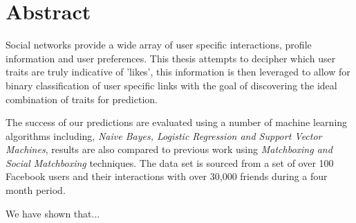 
\chapter*{Abstract}
\label{cha:abstract}

Social networks provide a wide array of user specific interactions, profile information and user preferences.
This thesis attempts to decipher which user traits are truly indicative of 'likes', this information is then leveraged to 
allow for binary classification of user specific links with the goal of discovering the ideal combination of traits for prediction.

The success of our predictions are evaluated using a number of machine learning algorithms including, \emph{Naive Bayes, Logistic Regression and Support Vector Machines},
results are also compared to previous work using \emph{Matchboxing and Social Matchboxing} techniques. The data set is sourced from 
a set of over 100 Facebook users and their interactions with over 30,000 friends during a four month period.

We have shown that...


